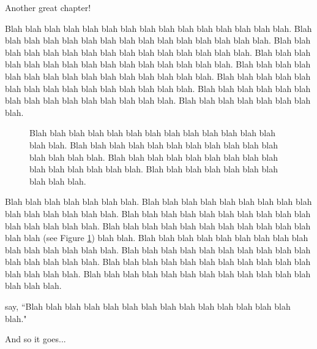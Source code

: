 Another great chapter!


Blah blah blah blah blah blah blah blah blah blah blah blah blah blah blah. Blah blah blah blah blah blah blah blah blah blah blah blah blah blah blah. Blah blah blah blah blah blah blah blah blah blah blah blah blah blah blah. Blah blah blah blah blah blah blah blah blah blah blah blah blah blah blah. Blah blah blah blah blah blah blah blah blah blah blah blah blah blah blah. Blah blah blah blah blah blah blah blah blah blah blah blah blah blah blah.  Blah blah blah blah blah blah blah blah blah blah blah blah blah blah blah. Blah blah blah blah blah blah blah blah.
\begin{figure}[h!]
\begin{center}
\caption{Blah blah blah blah blah blah blah blah blah blah blah blah blah blah blah. Blah blah blah blah blah blah blah blah blah blah blah blah blah blah blah. Blah blah blah blah blah blah blah blah blah blah blah blah blah blah blah.  Blah blah blah blah blah blah blah blah blah blah.}
\label{Figure1}
\end{center}
\end{figure}

Blah blah blah blah blah blah blah. Blah blah blah blah blah blah
blah blah blah blah blah blah blah blah blah. Blah blah blah blah
blah blah blah blah blah blah blah blah blah blah blah. Blah blah
blah blah blah blah blah blah blah blah blah blah blah (see Figure
\ref{Figure1}) blah blah. Blah blah blah blah blah blah blah blah
blah blah blah blah blah blah blah. Blah blah blah blah blah blah
blah blah blah blah blah blah blah blah blah. Blah blah blah blah
blah blah blah blah blah blah blah blah blah blah blah. Blah blah
blah blah blah blah blah blah blah blah blah blah blah blah blah.


say, ``Blah blah blah blah blah blah blah blah blah blah blah blah
blah blah blah."

And so it goes...

